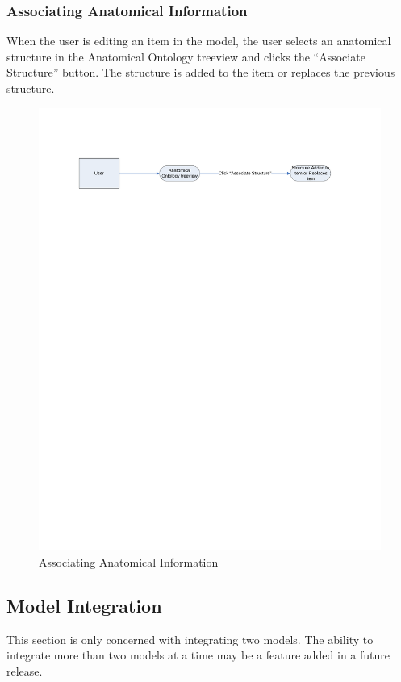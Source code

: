 \documentclass{article}
\begin{document}
\subsubsection{Associating Anatomical Information}
When the user is editing an item in the model, the user selects an anatomical structure in the Anatomical Ontology treeview and clicks the ``Associate Structure'' button. The structure is added to the item or replaces the previous structure.
\begin{figure}[!htb]
\centering
\includegraphics[width=\textwidth]{./diagrams/anatomy}
\caption{Associating Anatomical Information}
\end{figure}
\subsection{Model Integration}
This section is only concerned with integrating two models. The ability to integrate more than two models at a time may be a feature added in a future release.
\end{document}
